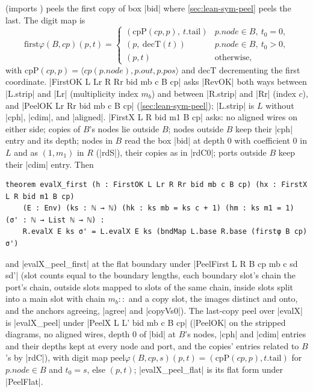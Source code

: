  (imports ) peels the first copy of box \lean|bid| where \cref{sec:lean-sym-peel} peels the last. The digit map is
\[
\mathrm{first}\varphi(B,cp)(p,t)=\begin{cases}(\mathrm{cpP}(cp,p),\ t.\mathrm{tail}) & p.\mathit{node}\in B,\ t_0=0,\\ (p,\ \mathrm{decT}(t)) & p.\mathit{node}\in B,\ t_0>0,\\ (p,t) & \text{otherwise,}\end{cases}
\]
with $\mathrm{cpP}(cp,p)=\langle cp(p.\mathit{node}),p.\mathit{out},p.\mathit{pos}\rangle$ and $\mathrm{decT}$ decrementing the first coordinate. \lean|FirstOK L Lr R Rr bid mb c B cp| asks \lean|RevOK| both ways between \lean|L.strip| and \lean|Lr| (multiplicity index $m_b$) and between \lean|R.strip| and \lean|Rr| (index $c$), and \lean|PeelOK Lr Rr bid mb c B cp| (\cref{sec:lean-sym-peel}); \lean|L.strip| is $L$ without \lean|cph|, \lean|cdim|, and \lean|aligned|. \lean|FirstX L R bid m1 B cp| asks: no aligned wires on either side; copies of $B$'s nodes lie outside $B$; nodes outside $B$ keep their \lean|cph| entry and its depth; nodes in $B$ read the box \lean|bid| at depth $0$ with coefficient $0$ in $L$ and as $(1,m_1)$ in $R$ (\lean|rdS|), their copies as in \lean|rdC0|; ports outside $B$ keep their \lean|cdim| entry. Then
\begin{lstlisting}[style=lean]
theorem evalX_first (h : FirstOK L Lr R Rr bid mb c B cp) (hx : FirstX L R bid m1 B cp)
    (E : Env) (ks : ℕ → ℕ) (hk : ks mb = ks c + 1) (hm : ks m1 = 1) (σ' : ℕ → List ℕ → ℕ) :
    R.evalX E ks σ' = L.evalX E ks (bndMap L.base R.base (firstφ B cp) σ')
\end{lstlisting}
and \lean|evalX_peel_first| at the flat boundary under \lean|PeelFirst L R B cp mb c sd sd'| (slot counts equal to the boundary lengths, each boundary slot's chain the port's chain, outside slots mapped to slots of the same chain, inside slots split into a main slot with chain $m_b::$ and a copy slot, the images distinct and onto, and the anchors agreeing, \lean|agree| and \lean|copyVs0|). The last-copy peel over \lean|evalX| is \lean|evalX_peel| under \lean|PeelX L L' bid mb c B cp| (\lean|PeelOK| on the stripped diagrams, no aligned wires, depth $0$ of \lean|bid| at $B$'s nodes, \lean|cph| and \lean|cdim| entries and their depths kept at every node and port, and the copies' entries related to $B$'s by \lean|rdC|), with digit map $\mathrm{peel}\varphi(B,cp,s)(p,t)=(\mathrm{cpP}(cp,p),t.\mathrm{tail})$ for $p.\mathit{node}\in B$ and $t_0=s$, else $(p,t)$; \lean|evalX_peel_flat| is its flat form under \lean|PeelFlat|.

